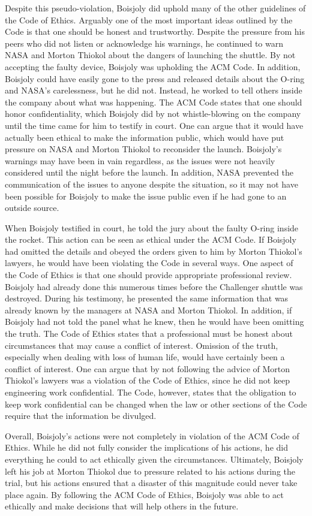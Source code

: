 \documentclass{paper}
\begin{document}
\begin{linenumbers}
Despite this pseudo-violation, Boisjoly did uphold many of the other guidelines of the Code of Ethics. Arguably one of the most important ideas outlined by the Code is that one should be honest and trustworthy. Despite the pressure from his peers who did not listen or acknowledge his warnings, he continued to warn NASA and Morton Thiokol about the dangers of launching the shuttle. By not accepting the faulty device, Boisjoly was upholding the ACM Code. In addition, Boisjoly could have easily gone to the press and released details about the O-ring and NASA's carelessness, but he did not. Instead, he worked to tell others inside the company about what was happening. The ACM Code states that one should honor confidentiality, which Boisjoly did by not whistle-blowing on the company until the time came for him to testify in court. One can argue that it would have actually been ethical to make the information public, which would have put pressure on NASA and Morton Thiokol to reconsider the launch. Boisjoly's warnings may have been in vain regardless, as the issues were not heavily considered until the night before the launch. In addition, NASA prevented the communication of the issues to anyone despite the situation, so it may not have been possible for Boisjoly to make the issue public even if he had gone to an outside source.

When Boisjoly testified in court, he told the jury about the faulty O-ring inside the rocket. This action can be seen as ethical under the ACM Code. If Boisjoly had omitted the details and obeyed the orders given to him by Morton Thiokol's lawyers, he would have been violating the Code in several ways. One aspect of the Code of Ethics is that one should provide appropriate professional review. Boisjoly had already done this numerous times before the Challenger shuttle was destroyed. During his testimony, he presented the same information that was already known by the managers at NASA and Morton Thiokol. In addition, if Boisjoly had not told the panel what he knew, then he would have been omitting the truth. The Code of Ethics states that a professional must be honest about circumstances that may cause a conflict of interest. Omission of the truth, especially when dealing with loss of human life, would have certainly been a conflict of interest. One can argue that by not following the advice of Morton Thiokol's lawyers was a violation of the Code of Ethics, since he did not keep engineering work confidential. The Code, however, states that the obligation to keep work confidential can be changed when the law or other sections of the Code require that the information be divulged.

Overall, Boisjoly's actions were not completely in violation of the ACM Code of Ethics. While he did not fully consider the implications of his actions, he did everything he could to act ethically given the circumstances. Ultimately, Boisjoly left his job at Morton Thiokol due to pressure related to his actions during the trial, but his actions ensured that a disaster of this magnitude could never take place again. By following the ACM Code of Ethics, Boisjoly was able to act ethically and make decisions that will help others in the future.
\end{linenumbers}
\newpage

\nocite{*}
\printbibliography
\end{document}
